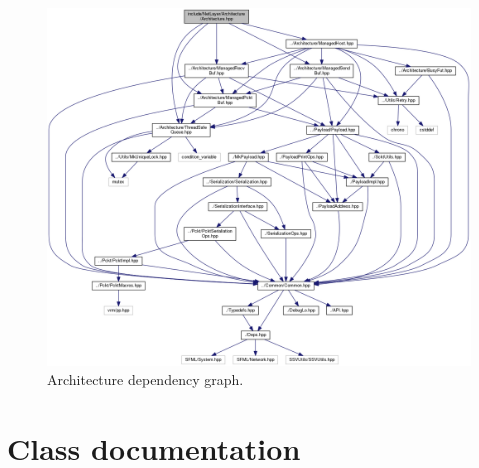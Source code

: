 \documentclass[12pt]{report}
\newcommand{\+}{\discretionary{\mbox{\scriptsize$\hookleftarrow$}}{}{}}
\begin{document}
\begin{figure}[!htb]
\caption{Architecture dependency graph.}
\centering
\includegraphics[width=1\textwidth]{inc/dep_archi.png}
\end{figure}

\chapter{Class documentation}

%


%
%







%
%
%


\end{document}
